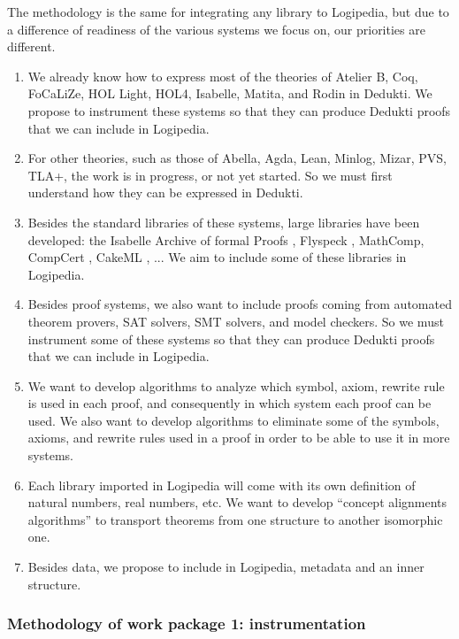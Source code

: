 The methodology is the same for integrating any library to Logipedia,
but due to a difference of readiness of the various systems we focus on,
our priorities are different.

\begin{enumerate}
\item We already know how to express most of the theories of Atelier B,
Coq, FoCaLiZe, HOL Light, HOL4, 
Isabelle, Matita, and Rodin in  Dedukti. We propose
to instrument these systems so that they can produce Dedukti
proofs that we can include in Logipedia.

\item For other theories, such as those of Abella, Agda, Lean, Minlog,
  Mizar, PVS, TLA+, the work is in progress, or not yet started.  So
  we must first understand how they can be expressed in Dedukti.

\item Besides the standard libraries of these systems, large libraries
  have been developed: the Isabelle Archive of formal Proofs \cite{AFP},
   Flyspeck \cite{Flyspeck}, MathComp\cite{Mathcomp}, 
  CompCert \cite{Compcert},  CakeML \cite{CakeML}, ...  We aim to include
  some of these libraries in Logipedia.
  
\item
Besides proof systems, we also want to include proofs coming from
automated theorem provers, SAT solvers, SMT solvers, and model
checkers.  So we must instrument some of these systems so that they
can produce Dedukti proofs that we can include in Logipedia.

\item
We want to develop algorithms to analyze which symbol, axiom, rewrite
rule is used in each proof, and consequently in which system each proof
can be used. We also want to develop algorithms to eliminate some of the 
symbols, axioms, and rewrite rules used in a proof in order to be able to 
use it in more systems.


\item
Each library imported in Logipedia will come with its own
definition of natural numbers, real numbers, etc. We want to develop
``concept alignments algorithms'' to transport theorems from one
structure to another isomorphic one.

\item 
Besides data, we propose to include in Logipedia, metadata and
an inner structure.
\end{enumerate}

\subsubsection{Methodology of work package 1: instrumentation}

